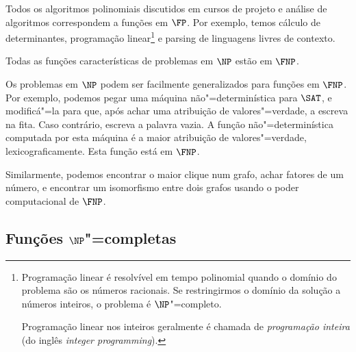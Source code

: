\begin{example}
    Todos os algoritmos polinomiais
    discutidos em cursos de projeto e análise de algoritmos
    correspondem a funções em $\FP$.
    Por exemplo,
    temos cálculo de determinantes,
    programação linear\footnote{
        Programação linear é resolvível em tempo polinomial
        quando o domínio do problema são os números racionais.
        Se restringirmos o domínio da solução a números inteiros,
        o problema é $\NP$"=completo.

        Programação linear nos inteiros geralmente é chamada de
        \emph{programação inteira}
        (do inglês \emph{integer programming}).
    }
    e parsing de linguagens livres de contexto.
\end{example}

\begin{uproposition}
    Todas as funções características de problemas em $\NP$ estão em $\FNP$.
\end{uproposition}

\begin{example}
    Os problemas em $\NP$ podem ser facilmente generalizados para funções em $\FNP$.
    Por exemplo,
    podemos pegar uma máquina não"=determinística para $\SAT$,
    e modificá"=la para que,
    após achar uma atribuição de valores"=verdade,
    a escreva na fita.
    Caso contrário,
    escreva a palavra vazia.
    A função não"=determinística computada por esta máquina
    é a maior atribuição de valores"=verdade,
    lexicograficamente.
    Esta função está em $\FNP$.

    Similarmente,
    podemos encontrar o maior clique num grafo,
    achar fatores de um número,
    e encontrar um isomorfismo entre dois grafos
    usando o poder computacional de $\FNP$.
\end{example}

\subsection{Funções $\NP$"=completas}
